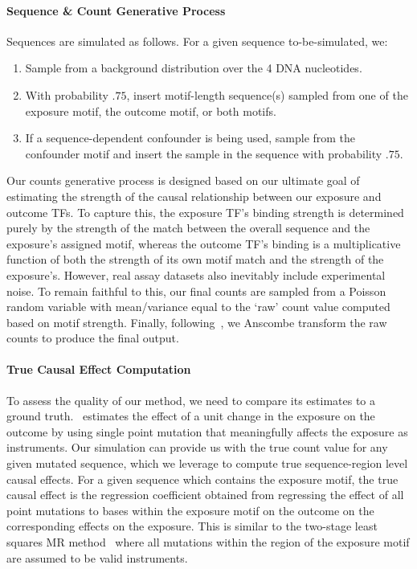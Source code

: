 \paragraph{Sequence \& Count Generative Process}
Sequences are simulated as follows. For a given sequence to-be-simulated, we:
\begin{enumerate}
	\item Sample from a background distribution over the 4 DNA nucleotides.
	\item With probability \( .75 \), insert motif-length sequence(s) sampled from one of the exposure motif, the outcome motif, or both motifs.
	\item If a sequence-dependent confounder is being used, sample from the confounder motif and insert the sample in the sequence with probability \( .75 \).
\end{enumerate}

Our counts generative process is designed based on our ultimate goal of estimating the strength of the causal relationship between our exposure and outcome TFs. To capture this, the exposure TF's binding strength is determined purely by the strength of the match between the overall sequence and the exposure's assigned motif, whereas the outcome TF's binding is a multiplicative function of both the strength of its own motif match and the strength of the exposure's. However, real assay datasets also inevitably include experimental noise. To remain faithful to this, our final counts are sampled from a Poisson random variable with mean/variance equal to the `raw' count value computed based on motif strength. Finally, following~\cite{finkelstein2020look}, we Anscombe transform the raw counts to produce the final output.

\paragraph{True Causal Effect Computation}
To assess the quality of our method, we need to compare its estimates to a ground truth. \method\ estimates the effect of a unit change in the exposure on the outcome by using single point mutation that meaningfully affects the exposure as instruments. Our simulation can provide us with the true count value for any given mutated sequence, which we leverage to compute true sequence-region level causal effects. For a given sequence which contains the exposure motif, the true causal effect is the regression coefficient obtained from regressing the effect of all point mutations to bases within the exposure motif on the outcome on the corresponding effects on the exposure. This is similar to the two-stage least squares MR method~\citep{angrist1995two} where all mutations within the region of the exposure motif are assumed to be valid instruments.

